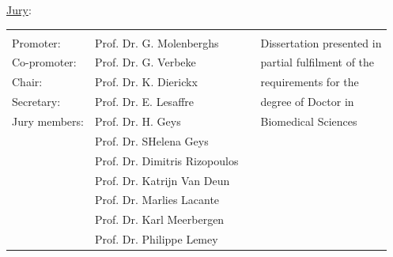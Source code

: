 \begin{titlepage}
{\vspace{2cm}
\begin{minipage}{0.4\textwidth}                                                    %
\begin{flushleft}   \small                                                        %
\hspace{0.3cm}\underline{Jury}:
\begin{tabular}{llp{0.5cm}l}
                 \vspace{0.5cm}  & \vspace{0.5cm}  &&\\
                 \hspace{0.1cm} Promoter: & Prof. Dr. G. Molenberghs&& Dissertation presented in  \\
                 \hspace{0.1cm} Co-promoter: & Prof. Dr. G. Verbeke&&  partial fulfilment of the \\
                 \hspace{0.1cm} Chair: & Prof. Dr. K. Dierickx&&  requirements for the \\
                 \hspace{0.1cm} Secretary: & Prof. Dr. E. Lesaffre&& degree of Doctor in \\
                 \hspace{0.1cm} Jury members: & Prof. Dr. H. Geys&&  Biomedical Sciences\\
                                                & Prof. Dr. SHelena Geys &&   \\
                                                & Prof. Dr. Dimitris Rizopoulos && \\
                                                &  Prof. Dr. Katrijn Van Deun  && \\
                                                &  Prof. Dr. Marlies Lacante  &&\\
                                                &  Prof. Dr. Karl Meerbergen  &&\\
                                                &  Prof. Dr. Philippe Lemey  &&
               \end{tabular}%
\end{flushleft}                                                                     %
\end{minipage}                                                   %

\vspace{1.2cm}
\begin{center}
\end{center}



}

\end{titlepage}
\clearpage
